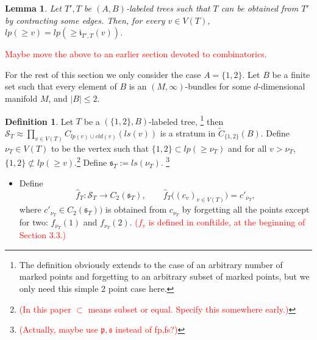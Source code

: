 \documentclass[11pt]{article}
\newtheorem{lmm}[thm]{Lemma}
\theoremstyle{definition}
\newtheorem{dfn}[thm]{Definition}
\theoremstyle{remark}
\def\wt#1{\widetilde{#1}}
\def\fs{\mathfrak{s}}
\def\cS{\mathcal{S}}
\def\cmt#1{\textcolor{red}{(#1)}}
\begin{document}
\begin{lmm}\label{treecontr1_lmm}
Let $T',T$ be $(A,B)$-labeled trees such that $T$ can be obtained from $T'$ by contracting some edges. 
Then, for every $v\in V(T)$, $lp(\ge v)=lp(\ge \mathfrak{i}_{T',T}(v))$. 
\end{lmm}


\textcolor{red}{Maybe move the above to an earlier section devoted to combinatorics.}


For the rest of this section we only consider the case $A=\{1,2\}$. Let $B$ be a finite set such that every element of $B$ is an $(M,\infty)$-bundles for some $d$-dimensional manifold $M$, and $|B|\le2$. 
\begin{dfn}%
Let $T$ be a $(\{1,2\},B)$-labeled tree,
\footnote{The definition obviously extends to the case of an arbitrary number of marked points and forgetting to an arbitrary subset of marked points, but we only need this simple 2 point case here.}
then $\cS_T\approx\prod_{v\in V(T)}C_{lp(v)\cup cld(v)}(ls(v))$ is a stratum in $\wt{C}_{\{1,2\}}(B)$.
Define $\nu_{T}\in V(T)$ to be the vertex such that $\{1,2\}\subset lp(\ge \nu_{T})$ and for all $v>\nu_{T}$, $\{1,2\}\not\subset lp(\ge v)$.\footnote{\cmt{In this paper $\subset$ means subset or equal. Specify this somewhere early.}}
Define $\fs_{T}:=ls(\nu_T)$. \footnote{\cmt{Actually, maybe use $\mathfrak{p},\fs$ instead of fp,fs?}}
\begin{itemize}
\item Define 
$$\hat{f}_{T}:\cS_T\longrightarrow {C}_{2}(\fs_{T}),\qquad \hat{f}_{T}\big((c_v)_{v\in V(T)}\big)=c'_{\nu_{T}},$$
where $c'_{\nu_{T}}\in C_{2}(\fs_{T}))$ is obtained from $c_{\nu_{T}}$ by forgetting all the points except for two: $f_{\nu_{T}}(1)$ and $f_{\nu_{T}}(2)$. \textcolor{red}{($f_v$ is defined in conftilde, at the beginning of Section 3.3.)}


\end{itemize}
\end{dfn}
\end{document}
